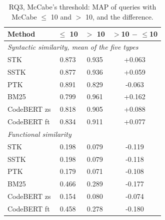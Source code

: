 \begin{table}[!htbp]
\centering
\caption{RQ3, McCabe's threshold: MAP of queries with McCabe $\leq$ 10 and $>$ 10, and the difference.}
\label{tab:mccabe10}
\footnotesize
\setlength{\tabcolsep}{3.5pt}
\begin{tabular}{lccc}
\toprule
Method & $\leq$ 10 & $>$ 10 & $>$10 $-$ $\leq$10 \\
\midrule
\multicolumn{4}{l}{\emph{Syntactic similarity, mean of the five types}} \\
\quad STK & 0.873 & 0.935 & +0.063 \\
\quad SSTK & 0.877 & 0.936 & +0.059 \\
\quad PTK & 0.891 & 0.829 & -0.063 \\
\quad BM25 & 0.799 & 0.961 & +0.162 \\
\quad CodeBERT zs & 0.818 & 0.905 & +0.088 \\
\quad CodeBERT ft & 0.834 & 0.911 & +0.077 \\
\midrule
\multicolumn{4}{l}{\emph{Functional similarity}} \\
\quad STK & 0.198 & 0.079 & -0.119 \\
\quad SSTK & 0.198 & 0.079 & -0.118 \\
\quad PTK & 0.179 & 0.071 & -0.108 \\
\quad BM25 & 0.466 & 0.289 & -0.177 \\
\quad CodeBERT zs & 0.154 & 0.080 & -0.074 \\
\quad CodeBERT ft & 0.458 & 0.278 & -0.180 \\
\bottomrule
\end{tabular}
\end{table}
